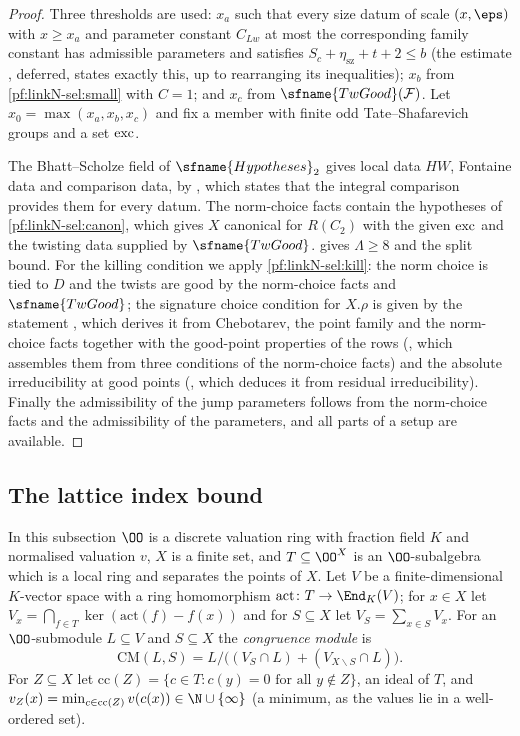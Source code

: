 \begin{proof}
Three thresholds are used: $x_a$ such that every size datum of scale $(x,\eps)$ with $x\ge x_a$ and parameter constant $C_{Lw}$ at most the
corresponding family constant has admissible parameters and satisfies $S_c+\eta_{\mathrm{sz}}+t+2\le b$ (the estimate
, deferred, states exactly this, up to rearranging its inequalities); $x_b$ from
\cref{pf:linkN-sel:small} with $C=1$; and $x_c$ from $\sfname{TwGood}(\mathcal F)$. Let $x_0=\max(x_a,x_b,x_c)$ and fix a member with
finite odd Tate--Shafarevich groups and a set $\mathrm{exc}$.

The Bhatt--Scholze field of $\sfname{Hypotheses}_2$ gives local data $HW$, Fontaine data and comparison data, by
, which states that the integral comparison provides them for every
datum. The norm-choice facts contain the hypotheses of \cref{pf:linkN-sel:canon}, which gives $X$ canonical for $R(C_2)$ with the given
$\mathrm{exc}$ and the twisting data supplied by $\sfname{TwGood}$.  gives $\Lambda\ge8$ and the split bound. For the
killing condition we apply \cref{pf:linkN-sel:kill}: the norm choice is tied to $D$ and the twists are good by the norm-choice facts and
$\sfname{TwGood}$; the signature choice condition for $X.\rho$ is given by the statement , which
derives it from Chebotarev, the point family and the norm-choice facts together with the good-point properties of the rows
(, which assembles them from three conditions of the norm-choice facts) and the
absolute irreducibility at good points (, which deduces it from
residual irreducibility). Finally the admissibility of the jump parameters follows from the norm-choice facts and the admissibility of the
parameters, and all parts of a setup are available.
\end{proof}

\subsection{The lattice index bound}\label{sec:pf:linkN-sel:pass}

In this subsection $\OO$ is a discrete valuation ring with fraction field $K$ and normalised valuation $v$, $X$ is a finite set, and
$T\subseteq\OO^X$ is an $\OO$-subalgebra which is a local ring and separates the points of $X$. Let $V$ be a finite-dimensional
$K$-vector space with a ring homomorphism $\mathrm{act}\colon T\to\End_K(V)$; for $x\in X$ let $V_x=\bigcap_{f\in T}\ker(\mathrm{act}(f)
-f(x))$ and for $S\subseteq X$ let $V_S=\sum_{x\in S}V_x$. For an $\OO$-submodule $L\subseteq V$ and $S\subseteq X$ the
\emph{congruence module} is
\[
\mathrm{CM}(L,S)=L\big/\bigl((V_S\cap L)+(V_{X\smallsetminus S}\cap L)\bigr).
\]
For $Z\subseteq X$ let $\mathrm{cc}(Z)=\{c\in T:c(y)=0\text{ for all }y\notin Z\}$, an ideal of $T$, and $v_Z(x)=\min_{c\in\mathrm{cc}(Z)}
v(c(x))\in\N\cup\{\infty\}$ (a minimum, as the values lie in a well-ordered set).

